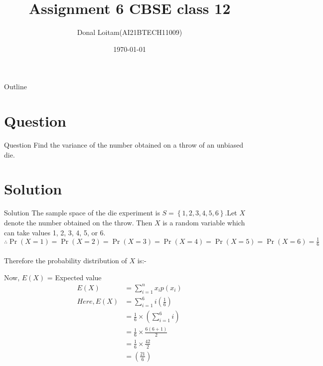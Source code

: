 \documentclass{beamer}
\title{Assignment 6 CBSE class 12}
\author{Donal Loitam(AI21BTECH11009)}
\date{\today}
\providecommand{\pr}[1]{\ensuremath{\Pr\left(#1\right)}}
\providecommand{\brak}[1]{\ensuremath{\left(#1\right)}}
\providecommand{\cbrak}[1]{\ensuremath{\left\{#1\right\}}}
\begin{document}
        \begin{frame}
            \titlepage 
          \end{frame}
          \logo{}
        
        \begin{frame}{Outline}     %
              \tableofcontents
            \end{frame}
        
    \section{Question}
        \begin{frame}{Question}
        Find the variance of the number obtained on a throw of an unbiased die.
        \end{frame}
    \section{Solution} 
        \begin{frame}{Solution}  
         The sample space of the die experiment is $S=\cbrak{1,2,3,4,5,6}$.Let $X$ denote the number obtained on the throw. Then $X$ is a random variable
        which can take values 1, 2, 3, 4, 5, or 6.   \\
        $\therefore \pr{X = 1} = \pr{X = 2} = \pr{X = 3} = \pr{X = 4} =\pr{X = 5} = \pr{X = 6} = \frac{1}{6}$ \\\\
        Therefore the probability distribution of $X$ is:-
        \begin{table}[ht!]
        \begin{center}
		
		\vspace*{5pt}
		\caption{}
		\label{table:table}
        \end{center}	
	    \end{table}
	    \end{frame}
        
        \begin{frame}
        Now, $E(X)$ = Expected value 
         \begin{align}
         E(X) &=  \sum_{i=1}^{n} x_{i}p(x_{i})\\
         Here , E(X) &=  \sum_{i=1}^{6} i  \brak{{\frac{1}{6}}}\\
                     &= \frac{1}{6} \times \brak{\sum_{i=1}^{6} i}\\
                     &= \frac{1}{6} \times \frac{6(6+1)}{2}\\
                     &= \frac{1}{6} \times \frac{42}{2}\\
                     &= \brak{\frac{21}{6}} 
         \end{align}
        \end{frame}
        
\end{document}
